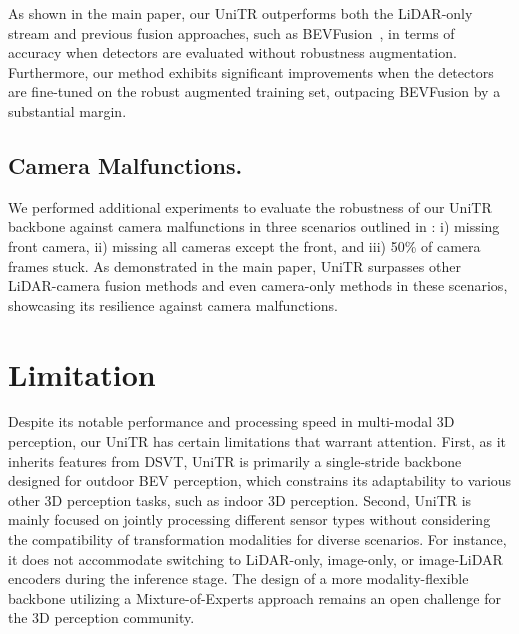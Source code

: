 \documentclass[10pt,twocolumn,letterpaper]{article}
\begin{document}
As shown in the main paper, our UniTR outperforms both the LiDAR-only stream and previous fusion approaches, such as BEVFusion~\cite{liang2022bevfusion}, in terms of accuracy when detectors are evaluated without robustness augmentation. Furthermore, our method exhibits significant improvements when the detectors are fine-tuned on the robust augmented training set, outpacing BEVFusion by a substantial margin.

\subsection{Camera Malfunctions.} We performed additional experiments to evaluate the robustness of our UniTR backbone against camera malfunctions in three scenarios outlined in \cite{liang2022bevfusion}: i) missing front camera, ii) missing all cameras except the front, and iii) 50\% of camera frames stuck. As demonstrated in the main paper, UniTR surpasses other LiDAR-camera fusion methods and even camera-only methods in these scenarios, showcasing its resilience against camera malfunctions.

\section{Limitation} \label{sec:limit}
Despite its notable performance and processing speed in multi-modal 3D perception, our UniTR has certain limitations that warrant attention. First, as it inherits features from DSVT, UniTR is primarily a single-stride backbone designed for outdoor BEV perception, which constrains its adaptability to various other 3D perception tasks, such as indoor 3D perception. Second, UniTR is mainly focused on jointly processing different sensor types without considering the compatibility of transformation modalities for diverse scenarios. For instance, it does not accommodate switching to LiDAR-only, image-only, or image-LiDAR encoders during the inference stage. The design of a more modality-flexible backbone utilizing a Mixture-of-Experts approach remains an open challenge for the 3D perception community.
\end{document}
